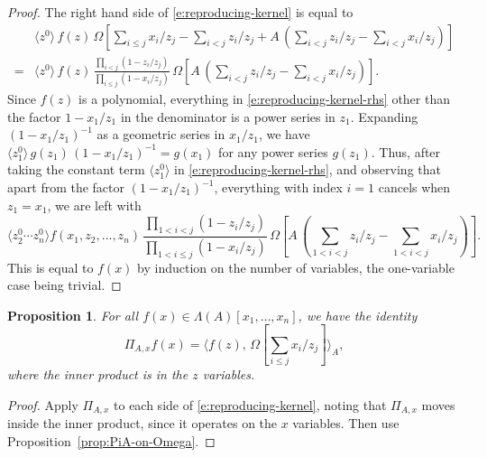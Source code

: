\documentclass[12pt]{amsart}
\newtheorem{prop}[thm]{Proposition}
\theoremstyle{definition}
\theoremstyle{remark}
\begin{document}
\begin{proof}
The right hand side of \eqref{e:reproducing-kernel} is equal to
\begin{equation}\label{e:reproducing-kernel-rhs}
\begin{aligned}
& \langle z^{0} \rangle\, f(z)\, \Omega [\sum _{i\leq j}x_{i}/z_{j} -
\sum _{i<j} z_{i}/z_{j} + A \, (\sum _{i<j}z_{i}/z_{j} -\sum _{i<j}
x_{i}/z_{j})]\\
 = & \langle z^{0} \rangle\, f(z)\, \frac{\prod _{i<j}(1 -
z_{i}/z_{j})}{ \prod _{i\leq j} (1 - x_{i}/z_{j})}\, \Omega [A \,
(\sum _{i<j}z_{i}/z_{j} -\sum _{i<j} x_{i}/z_{j})].
\end{aligned}
\end{equation}
Since $f(z)$ is a polynomial, everything in
\eqref{e:reproducing-kernel-rhs} other than the factor $1 -
x_{1}/z_{1}$ in the denominator is a power series in $z_{1}$.
Expanding $(1-x_{1}/z_{1})^{-1}$ as a geometric series in
$x_{1}/z_{1}$, we have $\langle z_{1}^{0} \rangle \, g(z_{1})\,
(1-x_{1}/z_{1})^{-1} = g(x_{1})$ for any power series $g(z_{1})$.
Thus, after taking the constant term $\langle z_{1}^{0} \rangle$ in
\eqref{e:reproducing-kernel-rhs}, and observing that apart from the
factor $(1-x_{1}/z_{1})^{-1}$, everything with index $i=1$ cancels
when $z_{1} = x_{1}$, we are left with
\begin{equation}\label{e:reproducing-kernel-reduced}
\langle z_{2}^{0}\cdots z_{n}^{0} \rangle f(x_{1},
z_{2},\ldots,z_{n})\, \frac{\prod _{1<i<j}(1 - z_{i}/z_{j})}{ \prod
_{1<i\leq j} (1 - x_{i}/z_{j})}\, \Omega [A\, (\sum
_{1<i<j}z_{i}/z_{j} -\sum _{1<i<j} x_{i}/z_{j})].
\end{equation}
This is equal to $f(x)$ by induction on the number of variables, the
one-variable case being trivial.
\end{proof}

\begin{prop}\label{prop:PiA-via-inner-product}
For all $f(x)\in \Lambda (A)[x_{1},\ldots,x_{n}]$, we have the
identity
\begin{equation}\label{e:PiA-via-inner-product}
\Pi _{A,x}f(x) = \langle f(z),\, \Omega [\sum _{i\leq j}x_{i}/z_{j}]
\rangle _{A},
\end{equation}
where the inner product is in the $z$ variables.

\end{prop}

\begin{proof}
Apply $\Pi _{A,x}$ to each side of \eqref{e:reproducing-kernel},
noting that $\Pi _{A,x}$ moves inside the inner product, since it
operates on the $x$ variables.  Then use
Proposition~\ref{prop:PiA-on-Omega}.
\end{proof}
\end{document}
